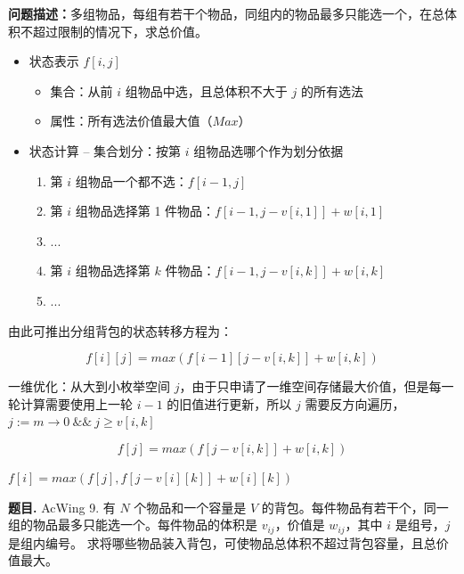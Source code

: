 \documentclass[12pt, a4paper, oneside]{ctexart}
\newenvironment{problem}{\begin{shaded}\par\noindent\textbf{题目. }}{\end{shaded}\par}
\begin{document}
\textbf {问题描述：}多组物品，每组有若干个物品，同组内的物品最多只能选一个，在总体积不超过限制的情况下，求总价值。

\begin{itemize}
\item 状态表示 $f[i,j]$
\begin{itemize}
\item 集合：从前 $i$ 组物品中选，且总体积不大于 $j$ 的所有选法
\item 属性：所有选法价值最大值（$Max$）
\end{itemize}
\item 状态计算 -- 集合划分：按第 $i$ 组物品选哪个作为划分依据
\begin{enumerate}
\item 第 $i$ 组物品一个都不选：$f[i-1,j]$
\item 第 $i$ 组物品选择第 1 件物品：$f[i-1,j - v[i,1]] + w[i,1]$
\item ...
\item 第 $i$ 组物品选择第 $k$ 件物品：$f[i-1, j-v[i,k]] + w[i,k]$
\item ...
\end{enumerate}
\end{itemize}

由此可推出分组背包的状态转移方程为：

\[
f[i][j] = max(f[i-1][j-v[i,k]] + w[i,k])
\]

一维优化：{\kaishu 从大到小枚举空间 $j$，由于只申请了一维空间存储最大价值，但是每一轮计算需要使用上一轮 $i-1$ 的旧值进行更新，所以 $j$ 需要反方向遍历，$ j := m \rightarrow 0 \ \&\& \ j \ge v[i,k]$}

\[
f[j] = max(f[j-v[i,k]] + w[i,k])
\]

\begin{algorithm}
 {
	 {
		 {
			 {
				$f[i] = max(f[j], f[j-v[i][k]] + w[i][k])$\;
			}
		}
	}
}
\end{algorithm}

\begin{problem}
AcWing 9. 有 $N$ 个物品和一个容量是 $V$ 的背包。每件物品有若干个，同一组的物品最多只能选一个。每件物品的体积是 $v_{ij}$，价值是 $w_{ij}$，其中 $i$ 是组号，$j$ 是组内编号。
求将哪些物品装入背包，可使物品总体积不超过背包容量，且总价值最大。
\end{problem}
\end{document}
